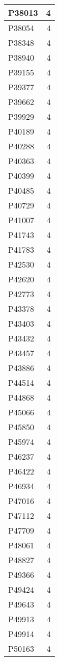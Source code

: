 \documentclass[
]{book}
\theoremstyle{definition}
\theoremstyle{definition}
\theoremstyle{definition}
\theoremstyle{definition}
\theoremstyle{remark}
\begin{document}
\begin{table}
\begin{tabular}{l|r}
\hline
P38013 & 4\\
\hline
P38054 & 4\\
\hline
P38348 & 4\\
\hline
P38940 & 4\\
\hline
P39155 & 4\\
\hline
P39377 & 4\\
\hline
P39662 & 4\\
\hline
P39929 & 4\\
\hline
P40189 & 4\\
\hline
P40288 & 4\\
\hline
P40363 & 4\\
\hline
P40399 & 4\\
\hline
P40485 & 4\\
\hline
P40729 & 4\\
\hline
P41007 & 4\\
\hline
P41743 & 4\\
\hline
P41783 & 4\\
\hline
P42530 & 4\\
\hline
P42620 & 4\\
\hline
P42773 & 4\\
\hline
P43378 & 4\\
\hline
P43403 & 4\\
\hline
P43432 & 4\\
\hline
P43457 & 4\\
\hline
P43886 & 4\\
\hline
P44514 & 4\\
\hline
P44868 & 4\\
\hline
P45066 & 4\\
\hline
P45850 & 4\\
\hline
P45974 & 4\\
\hline
P46237 & 4\\
\hline
P46422 & 4\\
\hline
P46934 & 4\\
\hline
P47016 & 4\\
\hline
P47112 & 4\\
\hline
P47709 & 4\\
\hline
P48061 & 4\\
\hline
P48827 & 4\\
\hline
P49366 & 4\\
\hline
P49424 & 4\\
\hline
P49643 & 4\\
\hline
P49913 & 4\\
\hline
P49914 & 4\\
\hline
P50163 & 4\\

\end{tabular}
\end{table}
\end{document}
